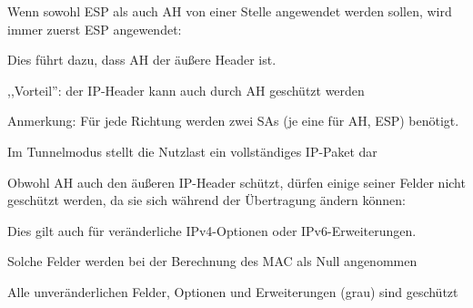 \documentclass[a4paper]{article}
\begin{document}
\begin{multicols}{3}
\begin{itemize*}
\begin{itemize*}
\begin{itemize*}
                        \item Wenn sowohl ESP als auch AH von einer Stelle angewendet werden sollen, wird immer zuerst ESP angewendet:
                  \end{itemize*}
                  \item Dies führt dazu, dass AH der äußere Header ist.
                  \item ,,Vorteil'': der IP-Header kann auch durch AH geschützt werden
                  \item Anmerkung: Für jede Richtung werden zwei SAs (je eine für AH, ESP) benötigt.
            \end{itemize*}
            \item Im Tunnelmodus stellt die Nutzlast ein vollständiges IP-Paket dar
            \item Obwohl AH auch den äußeren IP-Header schützt, dürfen einige seiner Felder nicht geschützt werden, da sie sich während der Übertragung ändern können:
            \begin{itemize*}
                  \item Dies gilt auch für veränderliche IPv4-Optionen oder IPv6-Erweiterungen.
                  \item Solche Felder werden bei der Berechnung des MAC als Null angenommen
            \end{itemize*}
            \item Alle unveränderlichen Felder, Optionen und Erweiterungen (grau) sind geschützt
      \end{itemize*}


\end{multicols}
\end{document}
